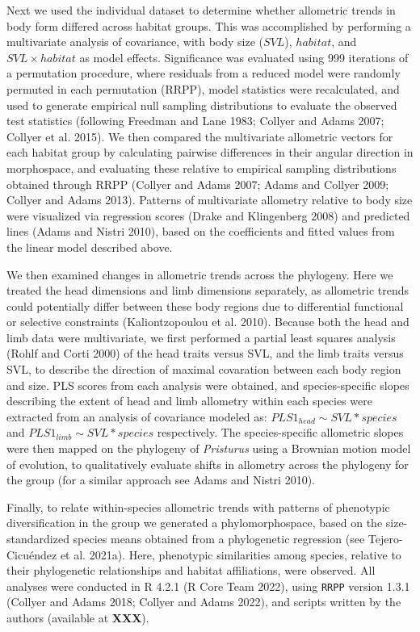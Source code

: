 \documentclass[
  11pt,
]{article}
\begin{document}
Next we used the individual dataset to determine whether allometric
trends in body form differed across habitat groups. This was
accomplished by performing a multivariate analysis of covariance, with
body size (\(SVL\)), \(habitat\), and \(SVL\times habitat\) as model
effects. Significance was evaluated using 999 iterations of a
permutation procedure, where residuals from a reduced model were
randomly permuted in each permutation (RRPP), model statistics were
recalculated, and used to generate empirical null sampling distributions
to evaluate the observed test statistics (following Freedman and Lane
1983; Collyer and Adams 2007; Collyer et al. 2015). We then compared the
multivariate allometric vectors for each habitat group by calculating
pairwise differences in their angular direction in morphospace, and
evaluating these relative to empirical sampling distributions obtained
through RRPP (Collyer and Adams 2007; Adams and Collyer 2009; Collyer
and Adams 2013). Patterns of multivariate allometry relative to body
size were visualized via regression scores (Drake and Klingenberg 2008)
and predicted lines (Adams and Nistri 2010), based on the coefficients
and fitted values from the linear model described above. \hfill\break

We then examined changes in allometric trends across the phylogeny. Here
we treated the head dimensions and limb dimensions separately, as
allometric trends could potentially differ between these body regions
due to differential functional or selective constraints (Kaliontzopoulou
et al. 2010). Because both the head and limb data were multivariate, we
first performed a partial least squares analysis (Rohlf and Corti 2000)
of the head traits versus SVL, and the limb traits versus SVL, to
describe the direction of maximal covaration between each body region
and size. PLS scores from each analysis were obtained, and
species-specific slopes describing the extent of head and limb allometry
within each species were extracted from an analysis of covariance
modeled as: \(PLS1_{head} \sim SVL*species\) and
\(PLS1_{limb} \sim SVL*species\) respectively. The species-specific
allometric slopes were then mapped on the phylogeny of \emph{Pristurus}
using a Brownian motion model of evolution, to qualitatively evaluate
shifts in allometry across the phylogeny for the group (for a similar
approach see Adams and Nistri 2010). \hfill\break

Finally, to relate within-species allometric trends with patterns of
phenotypic diversification in the group we generated a phylomorphospace,
based on the size-standardized species means obtained from a
phylogenetic regression (see Tejero-Cicuéndez et al. 2021a). Here,
phenotypic similarities among species, relative to their phylogenetic
relationships and habitat affiliations, were observed. All analyses were
conducted in R 4.2.1 (R Core Team 2022), using \texttt{RRPP} version
1.3.1 (Collyer and Adams 2018; Collyer and Adams 2022), and scripts
written by the authors (available at \textbf{XXX}).
\end{document}
